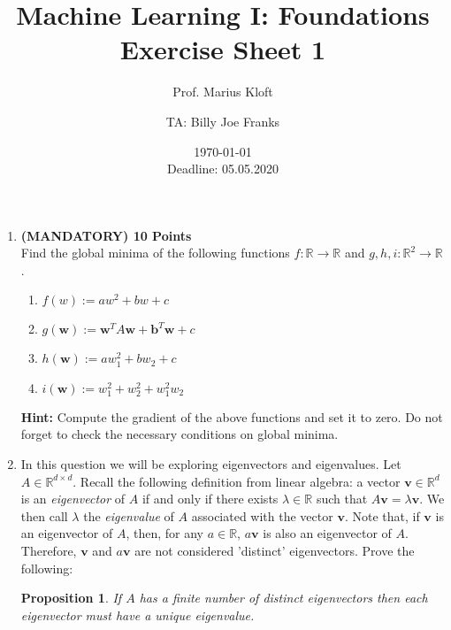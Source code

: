 \documentclass[]{scrartcl}
\author{Prof. Marius Kloft \and TA: Billy Joe Franks}
\title{Machine Learning I: Foundations \\ Exercise Sheet 1}
\date{\today\\Deadline: 05.05.2020}
\newcommand{\R}{\mathbb{R}}
\newcommand{\bb}{\mathbf{b}}
\newcommand{\bv}{\mathbf{v}}
\newcommand{\bw}{\mathbf{w}}
\newtheorem{prop}{Proposition}
\begin{document}
\maketitle

\begin{enumerate}

\item \textbf{(MANDATORY) 10 Points}\\
	Find the global minima of the following functions $f:\mathbb R\rightarrow\mathbb R$ and $g,h,i:\mathbb R^2\rightarrow\mathbb R$. 
	\begin{enumerate}
	\item $f(w):=aw^2+bw+c$
	\item $g(\bw):=\bw^TA\bw+\bb^T\bw+c$
	\item $h(\bw):=aw_1^2+bw_2+c$
	\item $i(\bw):=w_1^2+w_2^2+w_1^2w_2$
	\end{enumerate}
	\textbf{Hint:} Compute the gradient of the above functions and set it to zero. Do not forget to check the necessary conditions on global minima.

\item In this question we will be exploring eigenvectors and eigenvalues. Let $A \in \R^{d \times d}$. Recall the following definition from linear algebra: a vector $\bv \in \R^d$ is an {\em eigenvector} of $A$ if and only if there exists $\lambda \in \R$ such that $A \bv=\lambda \bv$. We then call $\lambda$ the {\em eigenvalue} of $A$ associated with the vector $\bv$. Note that, if $\bv$ is an eigenvector of $A$, then, for any $a \in \R$, $a\bv$ is also an eigenvector of $A$. Therefore, $\bv$ and $a\bv$ are not considered 'distinct' eigenvectors.
Prove the following:
	\begin{prop}
		If $A$ has a finite number of distinct eigenvectors then each eigenvector must have a unique eigenvalue.
	\end{prop}
	

\end{enumerate}
\end{document}
